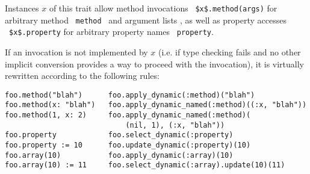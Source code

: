 Instances $x$ of this trait allow method invocations ~\lstinline[deletekeywords={method}]!$x$.method(args)! for arbitrary method ~\lstinline[deletekeywords={method}]!method!~ and argument lists , as well as property accesses ~\lstinline[deletekeywords={property}]!$x$.property! for arbitrary property names ~\lstinline[deletekeywords={property}]!property!. 

If an invocation is not implemented by $x$ (i.e. if type checking fails and no other implicit conversion provides a way to proceed with the invocation), it is virtually rewritten according to the following rules:

\begin{lstlisting}[deletekeywords={property,method}]
foo.method("blah")      foo.apply_dynamic(:method)("blah")
foo.method(x: "blah")   foo.apply_dynamic_named(:method)((:x, "blah"))
foo.method(1, x: 2)     foo.apply_dynamic_named(:method)(
                            (nil, 1), (:x, "blah"))
foo.property            foo.select_dynamic(:property)
foo.property := 10      foo.update_dynamic(:property)(10)
foo.array(10)           foo.apply_dynamic(:array)(10)
foo.array(10) := 11     foo.select_dynamic(:array).update(10)(11)
\end{lstlisting}











